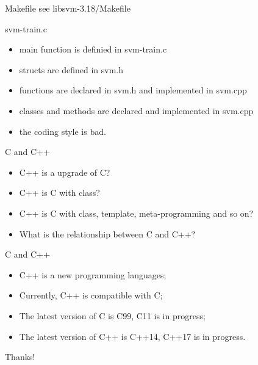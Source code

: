 \documentclass[UTF8]{beamer}
\begin{document}
\begin{frame}[t]{Makefile}
  see libsvm-3.18/Makefile
\end{frame}

\begin{frame}[t]{svm-train.c}
  \begin{itemize}
    \item main function is definied in svm-train.c
    \item structs are defined in svm.h
    \item functions are declared in svm.h and implemented in svm.cpp
    \item classes and methods are declared and implemented in svm.cpp
    \pause \item the coding style is bad.
  \end{itemize}
\end{frame}

\begin{frame}[t]{C and C++}
  \begin{itemize}
    \item C++ is a upgrade of C?
    \item C++ is C with class?
    \item C++ is C with class, template, meta-programming and so on?
    \item What is the relationship between C and C++?
  \end{itemize}
\end{frame}

\begin{frame}[t]{C and C++}
\begin{itemize}
  \item C++ is a new programming languages;
  \item Currently, C++ is compatible with C;
  \item The latest version of C is C99, C11 is in progress;
  \item The latest version of C++ is C++14, C++17 is in progress.
\end{itemize}
\end{frame}

\begin{frame}
  \centerline{\Huge{Thanks!}}
\end{frame}
\end{document}
